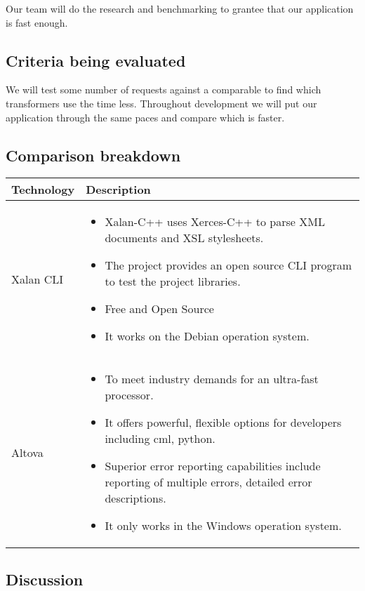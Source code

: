 Our team will do the research and benchmarking to grantee that our application is fast enough.

\subsection{Criteria being evaluated}

We will test some number of requests against a comparable to find which transformers use the time less.
Throughout development we will put our application through the same paces and compare which is faster.

\subsection{Comparison breakdown}

\begin{center}
  \begin{tabular}{ | l | p{10cm} |}
    \hline
    Technology & Description  \\ \hline
    Xalan CLI \cite{Xalan-C} &
    \begin{itemize}
      \item Xalan-C++ uses Xerces-C++ to parse XML documents and XSL stylesheets.
      \item The project provides an open source CLI program to test the project libraries.
      \item Free and Open Source
      \item It works on the Debian operation system. 
    \end{itemize}\\ \hline
    Altova \cite{Altova} &
    \begin{itemize}
      \item To meet industry demands for an ultra-fast processor.
      \item It offers powerful, flexible options for developers including cml, python.
      \item Superior error reporting capabilities include reporting of multiple errors, detailed error descriptions.
      \item It only works in the Windows operation system. 
    \end{itemize} \\ \hline
  \end{tabular}
\end{center}

\subsection{Discussion}

